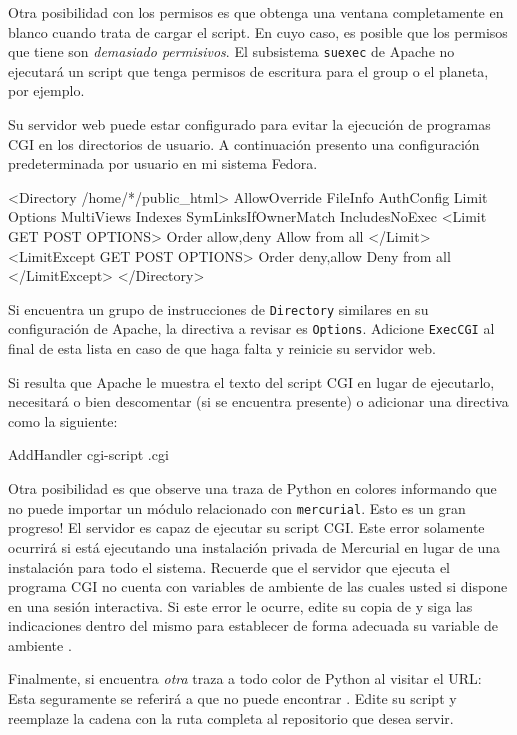 Otra posibilidad con los permisos es que obtenga una ventana
completamente en blanco cuando trata de cargar el script. En cuyo
caso, es posible que los permisos que tiene son \emph{demasiado
 permisivos}.  El subsistema \texttt{suexec} de Apache no ejecutará un
script que tenga permisos de escritura para el group o el planeta, por
ejemplo.

Su servidor web puede estar configurado para evitar la ejecución de
programas CGI en los directorios de usuario.  A continuación presento
una configuración predeterminada por usuario en mi sistema Fedora.

\begin{codesample2}
  <Directory /home/*/public_html>
      AllowOverride FileInfo AuthConfig Limit
      Options MultiViews Indexes SymLinksIfOwnerMatch IncludesNoExec
      <Limit GET POST OPTIONS>
          Order allow,deny
          Allow from all
      </Limit>
      <LimitExcept GET POST OPTIONS>
          Order deny,allow
          Deny from all
      </LimitExcept>
  </Directory>
\end{codesample2}
Si encuentra un grupo de instrucciones de \texttt{Directory} similares
en su configuración de Apache,  la directiva a revisar es \texttt{Options}.
Adicione \texttt{ExecCGI} al final de esta lista en caso de que haga
falta y reinicie su servidor web.

Si resulta que Apache le muestra el texto del script CGI en lugar de
ejecutarlo, necesitará o bien descomentar (si se encuentra presente) o
adicionar una directiva como la siguiente:
\begin{codesample2}
  AddHandler cgi-script .cgi
\end{codesample2}

Otra posibilidad es que observe una traza de Python en colores
informando que no puede importar un módulo relacionado con
\texttt{mercurial}.  Esto es un gran progreso!  El servidor es capaz
de ejecutar su script CGI.  Este error solamente ocurrirá si está
ejecutando una instalación privada de Mercurial en lugar de una
instalación para todo el sistema.  Recuerde que el servidor que
ejecuta el programa CGI no cuenta con variables de ambiente de las
cuales usted si dispone en una sesión interactiva.  Si este error le
ocurre, edite su copia de  y siga las indicaciones
dentro del mismo para establecer de forma adecuada su variable de
ambiente .

Finalmente, si encuentra \emph{otra} traza a todo color de Python al visitar
el URL: Esta seguramente se referirá a que no puede encontrar
.  Edite su script 
y reemplaze la cadena  con la ruta
completa al repositorio que desea servir.

